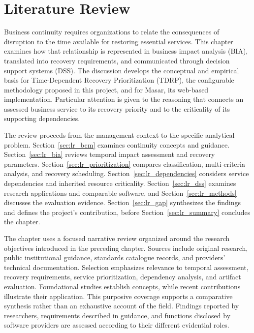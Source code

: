 \chapter{Literature Review}
\label{ch:literaturereview}

Business continuity requires organizations to relate the consequences of disruption to the time available for restoring essential services. This chapter examines how that relationship is represented in business impact analysis (BIA), translated into recovery requirements, and communicated through decision support systems (DSS). The discussion develops the conceptual and empirical basis for Time-Dependent Recovery Prioritization (TDRP), the configurable methodology proposed in this project, and for Masar, its web-based implementation. Particular attention is given to the reasoning that connects an assessed business service to its recovery priority and to the criticality of its supporting dependencies.

The review proceeds from the management context to the specific analytical problem. Section~\ref{sec:lr_bcm} examines continuity concepts and guidance. Section~\ref{sec:lr_bia} reviews temporal impact assessment and recovery parameters. Section~\ref{sec:lr_prioritization} compares classification, multi-criteria analysis, and recovery scheduling. Section~\ref{sec:lr_dependencies} considers service dependencies and inherited resource criticality. Section~\ref{sec:lr_dss} examines research applications and comparable software, and Section~\ref{sec:lr_methods} discusses the evaluation evidence. Section~\ref{sec:lr_gap} synthesizes the findings and defines the project's contribution, before Section~\ref{sec:lr_summary} concludes the chapter.

The chapter uses a focused narrative review organized around the research objectives introduced in the preceding chapter. Sources include original research, public institutional guidance, standards catalogue records, and providers' technical documentation. Selection emphasizes relevance to temporal assessment, recovery requirements, service prioritization, dependency analysis, and artifact evaluation. Foundational studies establish concepts, while recent contributions illustrate their application. This purposive coverage supports a comparative synthesis rather than an exhaustive account of the field. Findings reported by researchers, requirements described in guidance, and functions disclosed by software providers are assessed according to their different evidential roles.

